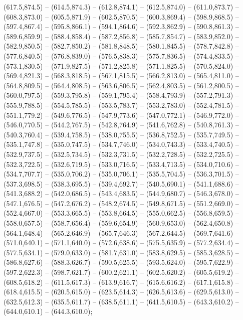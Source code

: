 (617.5,874.5) -- (614.5,874.3) -- (612.8,874.1) -- (612.5,874.0) -- (611.0,873.7) -- (608.3,873.0) -- (605.5,871.9) -- (602.5,870.5) -- (600.3,869.4) -- (598.9,868.5) -- (597.4,867.4) -- (595.8,866.1) -- (594.1,864.6) -- (592.3,862.9) -- (590.8,861.3) -- (589.6,859.9) -- (588.4,858.4) -- (587.2,856.8) -- (585.7,854.7) -- (583.9,852.0) -- (582.9,850.5) -- (582.7,850.2) -- (581.8,848.5) -- (580.1,845.5) -- (578.7,842.8) -- (577.6,840.5) -- (576.8,839.0) -- (576.5,838.3) -- (575.7,836.5) -- (574.4,833.5) -- (573.1,830.5) -- (571.9,827.5) -- (571.2,825.8) -- (571.1,825.5) -- (570.5,824.0) -- (569.4,821.3) -- (568.3,818.5) -- (567.1,815.5) -- (566.2,813.0) -- (565.4,811.0) -- (564.8,809.5) -- (564.4,808.5) -- (563.6,806.5) -- (562.4,803.5) -- (561.2,800.5) -- (560.0,797.5) -- (559.3,795.8) -- (559.1,795.4) -- (558.4,793.9) -- (557.2,791.3) -- (555.9,788.5) -- (554.5,785.5) -- (553.5,783.7) -- (553.2,783.0) -- (552.4,781.5) -- (551.1,779.2) -- (549.6,776.5) -- (547.9,773.6) -- (547.0,772.1) -- (546.9,772.0) -- (546.0,770.5) -- (544.2,767.5) -- (542.8,764.9) -- (541.6,762.8) -- (540.8,761.3) -- (540.3,760.4) -- (539.4,758.5) -- (538.0,755.5) -- (536.8,752.5) -- (535.7,749.5) -- (535.1,747.8) -- (535.0,747.5) -- (534.7,746.0) -- (534.0,743.3) -- (533.4,740.5) -- (532.9,737.5) -- (532.5,734.5) -- (532.3,731.5) -- (532.2,728.5) -- (532.2,725.5) -- (532.3,722.5) -- (532.6,719.5) -- (533.0,716.5) -- (533.4,713.5) -- (534.0,710.6) -- (534.7,707.7) -- (535.0,706.2) -- (535.0,706.1) -- (535.5,704.5) -- (536.3,701.5) -- (537.3,698.5) -- (538.3,695.5) -- (539.4,692.7) -- (540.5,690.1) -- (541.1,688.6) -- (541.3,688.2) -- (542.0,686.5) -- (543.4,683.5) -- (544.9,680.7) -- (546.3,678.0) -- (547.1,676.5) -- (547.2,676.2) -- (548.2,674.5) -- (549.8,671.5) -- (551.2,669.0) -- (552.4,667.0) -- (553.3,665.5) -- (553.8,664.5) -- (555.0,662.5) -- (556.8,659.5) -- (558.0,657.5) -- (558.7,656.4) -- (559.6,654.9) -- (560.9,653.0) -- (562.4,650.8) -- (564.1,648.4) -- (565.2,646.9) -- (565.7,646.3) -- (567.2,644.5) -- (569.7,641.6) -- (571.0,640.1) -- (571.1,640.0) -- (572.6,638.6) -- (575.5,635.9) -- (577.2,634.4) -- (577.5,634.1) -- (579.0,633.0) -- (581.7,631.0) -- (583.8,629.5) -- (585.3,628.5) -- (586.8,627.6) -- (588.3,626.7) -- (590.5,625.5) -- (593.5,624.0) -- (595.7,622.9) -- (597.2,622.3) -- (598.7,621.7) -- (600.2,621.1) -- (602.5,620.2) -- (605.5,619.2) -- (608.5,618.2) -- (611.5,617.3) -- (613.9,616.7) -- (615.6,616.2) -- (617.1,615.8) -- (618.4,615.5) -- (620.5,615.0) -- (623.5,614.3) -- (626.5,613.6) -- (629.5,613.0) -- (632.5,612.3) -- (635.5,611.7) -- (638.5,611.1) -- (641.5,610.5) -- (643.3,610.2) -- (644.0,610.1) -- (644.3,610.0);

